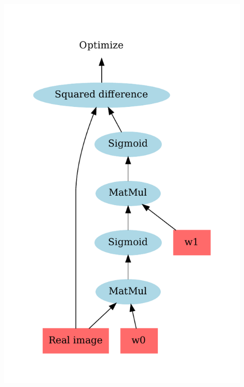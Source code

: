\documentclass{Bredelebeamer}
\begin{document}
\begin{frame}
\begin{columns}
\begin{column}{0.5\textwidth}
	\includegraphics[width=\textwidth]{sq_diff.pdf}
	\pause
\end{column}
\begin{column}{0.5\textwidth}  %

\end{column}
\end{columns}
\end{frame}
\end{document}
